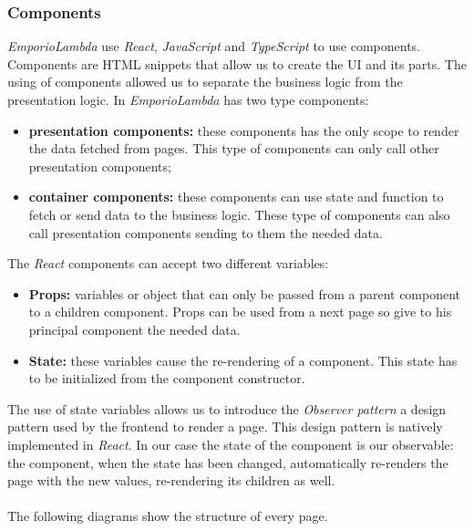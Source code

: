 \subsubsection{Components}
\textit{EmporioLambda} use \textit{React}, \textit{JavaScript} and \textit{TypeScript} to use components. Components are HTML snippets that allow us to create the UI and its parts. The using of components allowed us to separate the business logic from the presentation logic. In \textit{EmporioLambda} has two type components:
\begin{itemize}
  \item \textbf{presentation components:} these components has the only scope to render the data fetched from pages. This type of components can only call other presentation components;
  \item \textbf{container components:} these components can use state and function to fetch or send data to the business logic. These type of components can also call presentation components sending to them the needed data.
\end{itemize}
The \textit{React} components can accept two different variables:
\begin{itemize}
  \item \textbf{Props:} variables or object that can only be passed from a parent component to a children component. Props can be used from a next page so give to his principal component the needed data.
  \item \textbf{State:} these variables cause the re-rendering of a component. This state has to be initialized from the component constructor.
\end{itemize}
The use of state variables allows us to introduce the \textit{Observer pattern} a design pattern used by the frontend to render a page. This design pattern is natively implemented in \textit{React}. In our case the state of the component is our observable: the component, when the state has been changed, automatically re-renders the page with the new values, re-rendering its children as well.
\\
\\
The following diagrams show the structure of every page.
